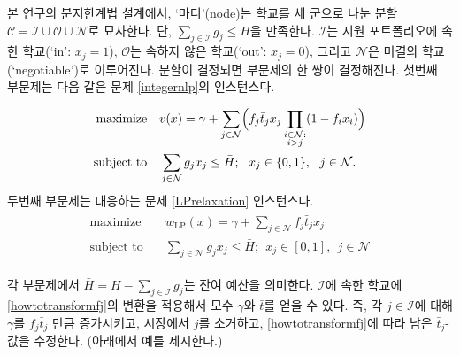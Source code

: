 \documentclass[11pt]{article} %
\newif\ifen
\theoremstyle{definition}
\theoremstyle{definition}
\begin{document}
\ifen 
In our branch-and-bound framework, a \emph{node} is characterized by a three-way partition of schools $\mathcal{C}= \mathcal{I} \cup \mathcal{O} \cup \mathcal{N}$ satisfying $\sum_{j \in \mathcal{I}} g_j \leq H$. $\mathcal{I}$ consists of schools that are ``in'' the application portfolio ($x_j = 1$), $\mathcal{O}$ consists of those that are ``out'' ($x_j = 0$), and $\mathcal{N}$ consists of those that are ``negotiable.'' 
The choice of partition induces a pair of subproblems. The first subproblem is an instance of Problem \ref{integernlp}, namely
\else
본 연구의 분지한계법 설계에서, `마디'(node)는 학교를 세 군으로 나눈 분할 $\mathcal{C}= \mathcal{I} \cup \mathcal{O} \cup \mathcal{N}$로 묘사한다. 단, $\sum_{j \in \mathcal{I}} g_j \leq H$을 만족한다. $\mathcal{I}$는 지원 포트폴리오에 속한 학교(`in': $x_j = 1$), $\mathcal{O}$는 속하지 않은 학교(`out': $x_j = 0$), 그리고 $\mathcal{N}$은 미결의 학교(`negotiable')로 이루어진다. 분할이 결정되면 부문제의 한 쌍이 결정해진다. 첫번째 부문제는 다음 같은 문제 \ref{integernlp}의 인스턴스다.
\fi
\begin{align} \label{nodenlpsubproblem}
\begin{split}
\text{maximize}\quad &  v(x) = \gamma + \sum_{j \in \mathcal{N}} \Bigl(f_j \bar t_j x_j \prod_{\substack{i \in \mathcal{N}:\\i > j}} (1 - f_{i} x_i) \Bigr)\\
\text{subject to}\quad & \sum_{j \in \mathcal{N}} g_j x_j \leq \bar H; ~~ x_j \in \{0, 1\},~~j \in \mathcal{N}.
\end{split}
\end{align}
\ifen The second is the corresponding instance of Problem \ref{LPrelaxation}:
\else 두번째 부문제는 대응하는 문제 \ref{LPrelaxation} 인스턴스다.\fi
\begin{align} \label{nodelprelaxation}
\begin{split}
\text{maximize}\quad &  w_{\mathrm{LP}}(x)= \gamma + \sum_{j \in \mathcal{N}}  f_j \bar t_j  x_j \\
\text{subject to}\quad & \sum_{j \in \mathcal{N}} g_j x_j \leq \bar H; ~~ x_j \in [0, 1],~~j \in \mathcal{N}
\end{split}
\end{align}
\ifen
In both subproblems, $\bar H = H - \sum_{j\in \mathcal{I}} g_j$ denotes the residual budget. The parameters $\gamma$ and $\bar t$ are obtained by iteratively applying the transformation \eqref{howtotransformfj} to the schools in $\mathcal{I}$. For each $j\in \mathcal{I}$,  we increment $\gamma$ by the current value of $f_j \bar t_j$, eliminate $j$ from the market, and update the remaining $\bar t_j$-values using \eqref{howtotransformfj}. (An example is provided below.)
\else
각 부문제에서 $\bar H = H - \sum_{j\in \mathcal{I}} g_j$는 잔여 예산을 의미한다. $\mathcal{I}$에 속한 학교에 \eqref{howtotransformfj}의 변환을 적용해서 모수 $\gamma$와 $\bar t$를 얻을 수 있다. 즉, 각 $j\in \mathcal{I}$에 대해 $\gamma$를 $f_j \bar t_j$ 만큼 증가시키고, 시장에서 $j$를 소거하고, \eqref{howtotransformfj}에 따라 남은 $\bar t_j$-값을 수정한다. (아래에서 예를 제시한다.)
\fi
\end{document}
